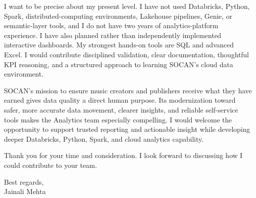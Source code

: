 \documentclass[letterpaper,10pt]{article}
\begin{document}
I want to be precise about my present level. I have not used Databricks, Python, Spark, distributed-computing environments, Lakehouse pipelines, Genie, or semantic-layer tools, and I do not have two years of analytics-platform experience. I have also planned rather than independently implemented interactive dashboards. My strongest hands-on tools are SQL and advanced Excel. I would contribute disciplined validation, clear documentation, thoughtful KPI reasoning, and a structured approach to learning SOCAN's cloud data environment.

SOCAN's mission to ensure music creators and publishers receive what they have earned gives data quality a direct human purpose. Its modernization toward safer, more accurate data movement, clearer insights, and reliable self-service tools makes the Analytics team especially compelling. I would welcome the opportunity to support trusted reporting and actionable insight while developing deeper Databricks, Python, Spark, and cloud analytics capability.

Thank you for your time and consideration. I look forward to discussing how I could contribute to your team.

Best regards,\\[8pt]
Jainali Mehta
\end{document}
